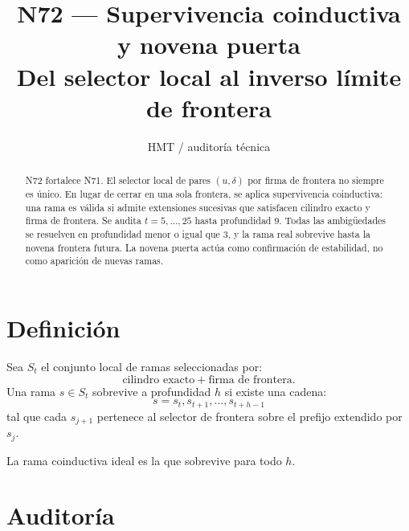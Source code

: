 \documentclass[11pt,a4paper]{article}
\title{\bfseries N72 --- Supervivencia coinductiva y novena puerta\\
\large Del selector local al inverso límite de frontera}
\author{HMT / auditoría técnica}
\date{}
\begin{document}
\maketitle

\begin{abstract}
N72 fortalece N71. El selector local de pares \((u,\delta)\) por firma de frontera no siempre es único. En lugar de cerrar en una sola frontera, se aplica supervivencia coinductiva: una rama es válida si admite extensiones sucesivas que satisfacen cilindro exacto y firma de frontera. Se audita \(t=5,\ldots,25\) hasta profundidad \(9\). Todas las ambigüedades se resuelven en profundidad menor o igual que \(3\), y la rama real sobrevive hasta la novena frontera futura. La novena puerta actúa como confirmación de estabilidad, no como aparición de nuevas ramas.
\end{abstract}

\section{Definición}

Sea \(S_t\) el conjunto local de ramas seleccionadas por:
\[
\text{cilindro exacto}+\text{firma de frontera}.
\]
Una rama \(s\in S_t\) sobrevive a profundidad \(h\) si existe una cadena:
\[
s=s_t,s_{t+1},\ldots,s_{t+h-1}
\]
tal que cada \(s_{j+1}\) pertenece al selector de frontera sobre el prefijo extendido por \(s_j\).

La rama coinductiva ideal es la que sobrevive para todo \(h\).

\section{Auditoría}
\end{document}
